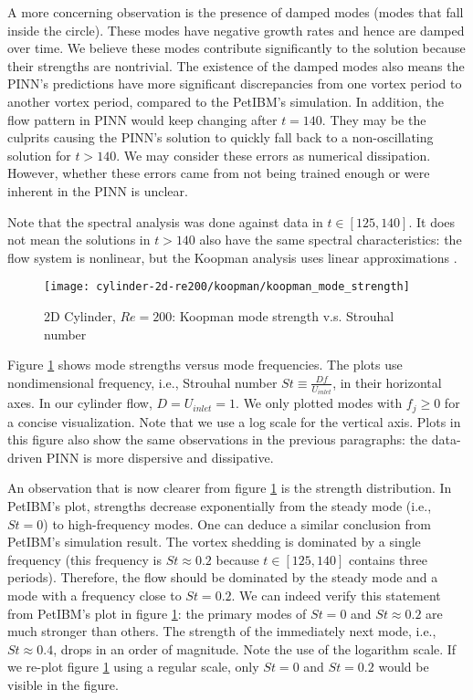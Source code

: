 A more concerning observation is the presence of damped modes (modes that fall inside the circle). 
These modes have negative growth rates and hence are damped over time.
We believe these modes contribute significantly to the solution because their strengths are nontrivial.
The existence of the damped modes also means the PINN's predictions have more significant discrepancies from one vortex period to another vortex period, compared to the PetIBM's simulation.
In addition, the flow pattern in PINN would keep changing after $t=140$.
They may be the culprits causing the PINN's solution to quickly fall back to a non-oscillating solution for $t>140$.
We may consider these errors as numerical dissipation.
However, whether these errors came from not being trained enough or were inherent in the PINN is unclear.

Note that the spectral analysis was done against data in $t\in[125, 140]$.
It does not mean the solutions in $t>140$ also have the same spectral characteristics: the flow system is nonlinear, but the Koopman analysis uses linear approximations \cite{rowley_spectral_2009}.

\begin{figure}[hbt!]
    \centering
    \texttt{[image: cylinder-2d-re200/koopman/koopman\_mode\_strength]}
    \caption{2D Cylinder, $Re=200$: Koopman mode strength v.s. Strouhal number}
    \label{fig:koopman-freq-st}
\end{figure}

Figure \ref{fig:koopman-freq-st} shows mode strengths versus mode frequencies.
The plots use nondimensional frequency, i.e., Strouhal number $St\equiv\frac{Df}{U_{inlet}}$, in their horizontal axes. 
In our cylinder flow, $D=U_{inlet} = 1$.
We only plotted modes with $f_j \ge 0$ for a concise visualization.
Note that we use a log scale for the vertical axis.
Plots in this figure also show the same observations in the previous paragraphs: the data-driven PINN is more dispersive and dissipative.

An observation that is now clearer from figure \ref{fig:koopman-freq-st} is the strength distribution.
In PetIBM's plot, strengths decrease exponentially from the steady mode (i.e., $St=0$) to high-frequency modes.
One can deduce a similar conclusion from PetIBM's simulation result.
The vortex shedding is dominated by a single frequency (this frequency is $St\approx 0.2$ because $t\in[125, 140]$ contains three periods).
Therefore, the flow should be dominated by the steady mode and a mode with a frequency close to $St=0.2$.
We can indeed verify this statement from PetIBM's plot in figure \ref{fig:koopman-freq-st}: the primary modes of $St=0$ and $St\approx 0.2$ are much stronger than others.
The strength of the immediately next mode, i.e., $St\approx 0.4$, drops in an order of magnitude. 
Note the use of the logarithm scale.
If we re-plot figure \ref{fig:koopman-freq-st} using a regular scale, only $St=0$ and $St=0.2$ would be visible in the figure.

